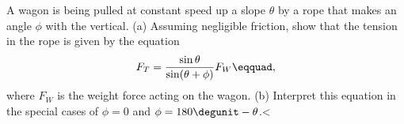   A wagon is being pulled at constant speed up a slope
$\theta $ by a rope that makes an angle $\phi $ with the
vertical.\hwendpart
 (a) Assuming negligible friction, show that the
tension in the rope is given by the equation
\begin{equation*}
  F_T = \frac{\sin\theta}{\sin(\theta+\phi)}F_W\eqquad,
\end{equation*}
where $F_W$ is the weight force acting on the wagon.\hwendpart
 (b)
Interpret this equation in the special cases of $\phi=0$
and $\phi =180\degunit-\theta$.<%
